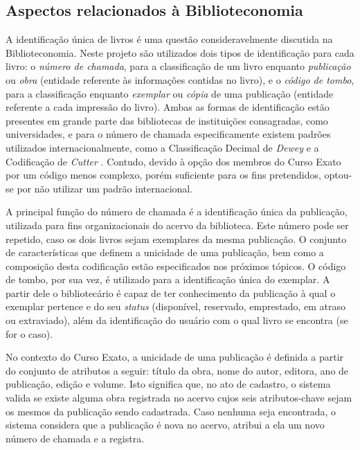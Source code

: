 \documentclass[a4paper]{article}
\begin{document}
\subsection{Aspectos relacionados à Biblioteconomia}\label{ssec:bibl}

A identificação única de livros é uma questão consideravelmente discutida na Biblioteconomia. Neste projeto são utilizados dois tipos de identificação para cada livro: o \textit{número de chamada}, para a classificação de um livro enquanto \textit{publicação} ou \textit{obra} (entidade referente às informações contidas no livro), e o \textit{código de tombo}, para a classificação enquanto \textit{exemplar} ou \textit{cópia} de uma publicação (entidade referente a cada impressão do livro). Ambas as formas de identificação estão presentes em grande parte das bibliotecas de instituições consagradas, como universidades, e para o número de chamada especificamente existem padrões utilizados internacionalmente, como a Classificação Decimal de \textit{Dewey} \cite{dewey} e a Codificação de \textit{Cutter} \cite{cutter}. Contudo, devido à opção dos membros do Curso Exato por um código menos complexo, porém suficiente para os fins pretendidos, optou-se por não utilizar um padrão internacional. 

A principal função do número de chamada é a identificação única da publicação, utilizada para fins organizacionais do acervo da biblioteca. Este número pode ser repetido, caso os dois livros sejam exemplares da mesma publicação. O conjunto de características que definem a unicidade de uma publicação, bem como a composição desta codificação estão especificados nos próximos tópicos. O código de tombo, por sua vez, é utilizado para a identificação única do exemplar. A partir dele o bibliotecário é capaz de ter conhecimento da publicação à qual o exemplar pertence e do seu \textit{status} (disponível, reservado, emprestado, em atraso ou extraviado), além da identificação do usuário com o qual livro se encontra (se for o caso).

No contexto do Curso Exato, a unicidade de uma publicação é definida a partir do conjunto de atributos a seguir: título da obra, nome do autor, editora, ano de publicação, edição e volume. Isto significa que, no ato de cadastro, o sistema valida se existe alguma obra registrada no acervo cujos seis atributos-chave sejam os mesmos da publicação sendo cadastrada. Caso nenhuma seja encontrada, o sistema considera que a publicação é nova no acervo, atribui a ela um novo número de chamada e a registra.
\end{document}
